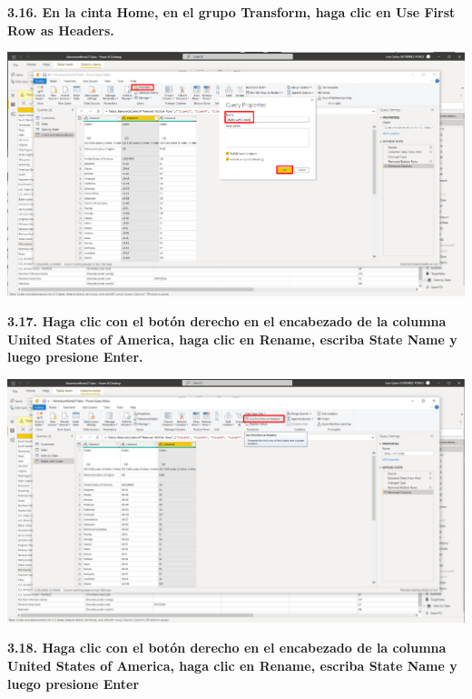 \documentclass{article}
\begin{document}
\textbf{3.16. En la cinta \textbf{Home}, en el grupo \textbf{Transform}, haga clic en \textbf{Use First Row as Headers}.}

    \begin{center}
		\includegraphics[width=14cm]{./images/64} 
	\end{center}
\newpage
\textbf{3.17. Haga clic con el botón derecho en el encabezado de la columna \textbf{United States of America}, haga clic en \textbf{Rename}, escriba \textbf{State Name} y luego presione Enter.}

    \begin{center}
		\includegraphics[width=14cm]{./images/65} 
	\end{center}

\textbf{3.18.  Haga clic con el botón derecho en el encabezado de la columna \textbf{United States of America}, haga clic en \textbf{Rename}, escriba \textbf{State Name} y luego presione Enter }
\end{document}
